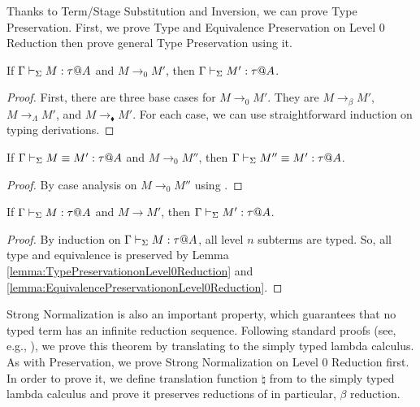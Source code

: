 
Thanks to Term/Stage Substitution and Inversion, we can prove Type
Preservation.  First, we prove Type and Equivalence Preservation on Level 0
Reduction then prove general Type Preservation using it.

\begin{lemma}
    \label{lemma:TypePreservationonLevel0Reduction}
    If \( \Gamma \vdash_\Sigma M : \tau @ A \) and \( M \longrightarrow_0 M' \), then \( \Gamma \vdash_\Sigma M' : \tau @ A \).
\end{lemma}

\begin{proof}
    First, there are three base cases for $M \longrightarrow_0 M'$.  They are $M
    \longrightarrow_\beta M'$, $M \longrightarrow_\Lambda M'$, and $M
    \longrightarrow_\blacklozenge M'$.  For each case, we can use
    straightforward induction on typing derivations.
\end{proof}

\begin{lemma}
    \label{lemma:EquivalencePreservationonLevel0Reduction}
    If \( \Gamma \vdash_\Sigma M \equiv M' : \tau @ A \) and \( M \longrightarrow_0 M'' \), then \( \Gamma \vdash_\Sigma M'' \equiv M' : \tau @ A \).
\end{lemma}

\begin{proof}
    By case analysis on \( M \longrightarrow_0 M'' \) using \QTrans.
\end{proof}

\begin{theorem}
    \label{theorem:TypePreservation}
    If \( \Gamma \vdash_\Sigma M : \tau @ A \) and \( M \longrightarrow M' \), then \( \Gamma \vdash_\Sigma M' : \tau @ A \).
\end{theorem}

\begin{proof} 
    By induction on \( \Gamma \vdash_\Sigma M : \tau @ A \), all level \( n \) subterms are
    typed. So, all type and equivalence is preserved by Lemma
    \ref{lemma:TypePreservationonLevel0Reduction} and
    \ref{lemma:EquivalencePreservationonLevel0Reduction}.
\end{proof}


Strong Normalization is also an important property, which guarantees that no
typed term has an infinite reduction sequence.  Following standard proofs (see,
e.g., \cite{harper1993framework}), we prove this theorem by translating \LMD to
the simply typed lambda calculus. As with Preservation, we prove Strong
Normalization on Level 0 Reduction first. In order to prove it, we define
translation function \( \natural \) from \LMD to the simply typed lambda
calculus and prove it preserves reductions of \LMD in particular, \( \beta \)
reduction.

